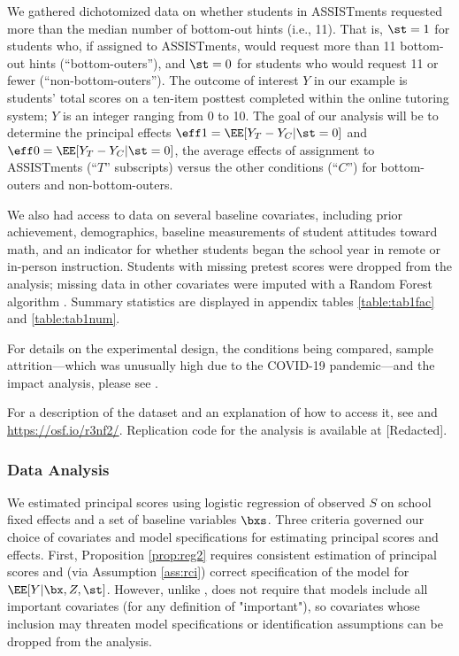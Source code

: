 \documentclass[]{article}
\begin{document}
\sloppy
We gathered dichotomized data on %
whether students in ASSISTments requested more than the median number of bottom-out hints (i.e., 11).
That is, $\st=1$ for students who, if assigned to ASSISTments, would request more than 11 bottom-out hints (``bottom-outers''), and $\st=0$ for students who would request 11 or fewer (``non-bottom-outers''). %
The outcome of interest $Y$ in our example is students' total scores on a ten-item posttest completed within the online tutoring system; $Y$ is an integer ranging from 0 to 10.
The goal of our analysis will be to determine the principal effects $\eff1=\EE[\yt-\yc|\st=0]$ and $\eff0=\EE[\yt-\yc|\st=0]$, the average effects of assignment to ASSISTments (``$T$'' subscripts) versus the other conditions (``$C$'') for bottom-outers and non-bottom-outers.

We also had access to data on several baseline covariates, including prior achievement, demographics, baseline measurements of student attitudes toward math, and an indicator for whether students began the school year in remote or in-person instruction.
Students with missing pretest scores were dropped from the analysis; missing data in other covariates were imputed with a Random Forest algorithm \citep{missForest}. Summary statistics are displayed in appendix tables \ref{table:tab1fac} and \ref{table:tab1num}.

For details on the experimental design, the conditions being compared, sample attrition---which was unusually high due to the COVID-19 pandemic---and the impact analysis, please see \citet{impactPaper}.

For a description of the dataset and an explanation of how to access it, see \citet{ottmar2023data} and \url{https://osf.io/r3nf2/}.
Replication code for the analysis is available at [Redacted].

\subsubsection{Data Analysis}
We estimated principal scores using logistic regression of observed $S$ on school fixed effects and a set of baseline variables $\bxs$.
Three criteria governed our choice of covariates and model specifications for estimating principal scores and effects.
First, Proposition \ref{prop:reg2} requires consistent estimation of principal scores and (via Assumption \ref{ass:rci}) correct specification of the model for $\EE[Y|\bx,Z,\st]$.
However, unlike \psw, \geepers does not require that models include all important covariates (for any definition of "important"), so covariates whose inclusion may threaten model specifications or identification assumptions can be dropped from the analysis. 
\end{document}
